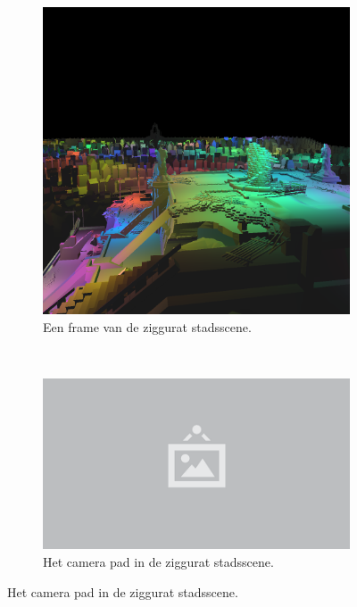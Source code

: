 \begin{figure}[p]
  \begin{subfigure}[b]{.95\linewidth}
    \centering\includegraphics[width=\textwidth]{./img/raw/test-suite-ziggurat-city-frame.png}
    \caption{Een frame van de ziggurat stadsscene.}\label{fig:test-suite-ziggurat:frame}
  \end{subfigure}
  \\
  \begin{subfigure}[b]{.33\linewidth}
    \centering\includegraphics[width=\textwidth]{./img/raw/placeholder.png}
    \caption{Het camera pad in de ziggurat stadsscene.}\label{fig:test-suite-ziggurat:camera}
  \end{subfigure}%

\end{figure}
